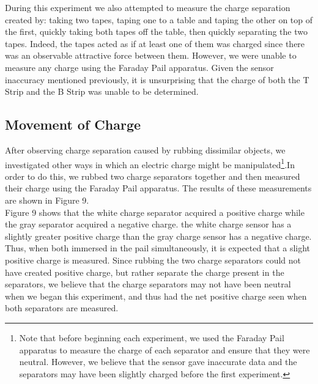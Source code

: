 \documentclass[12pt]{amsart}
\begin{document}
\indent During this experiment we also attempted to measure the charge separation created by: taking two tapes, taping one to a table and taping the other on top of the first, quickly taking both tapes off the table, then quickly separating the two tapes. Indeed, the tapes acted as if at least one of them was charged since there was an observable attractive force between them. However, we were unable to measure any charge using the Faraday Pail apparatus. Given the sensor inaccuracy mentioned previously, it is unsurprising that the charge of both the T Strip and the B Strip was unable to be determined.\\

\subsection{Movement of Charge}

\indent After observing charge separation caused by rubbing dissimilar objects, we investigated other ways in which an electric charge might be manipulated\footnote{Note that before beginning each experiment, we used the Faraday Pail apparatus to measure the charge of each separator and ensure that they were neutral. However, we believe that the sensor gave inaccurate data and the separators may have been slightly charged before the first experiment. }.In order to do this, we rubbed two charge separators together and then measured their charge using the Faraday Pail apparatus. The results of these measurements are shown in Figure 9.\\


\indent Figure 9 shows that the white charge separator acquired a positive charge while the gray separator acquired a negative charge. the white charge sensor has a slightly greater positive charge than the gray charge sensor has a negative charge. Thus, when both immersed in the pail simultaneously, it is expected that a slight positive charge is measured. Since rubbing the two charge separators could not have created positive charge, but rather separate the charge present in the separators, we believe that the charge separators may not have been neutral when we began this experiment, and thus had the net positive charge seen when both separators are measured.\\
\end{document}

